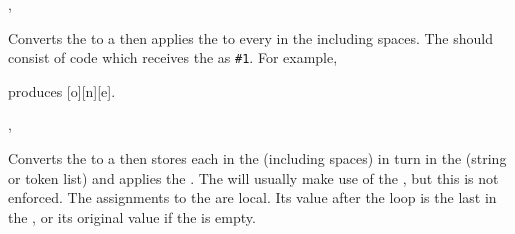 \documentclass[oneside]{book}
\begin{document}
\begin{function}{\StrMapInline,\StrVarMapInline}
\begin{syntax}
  
  
\end{syntax}
Converts the  to a  then
applies the  to every  in the
 including spaces.
The  should consist of code which
receives the  as \verb|#1|.
For example,
\begin{codehigh}
\IgnoreSpacesOn
\StrClear \lTmpaStr
{} {
  \StrPutRight \lTmpaStr {[#1]}
}
\Result{\StrUse\lTmpaStr}
\IgnoreSpacesOff
\end{codehigh}
produces [o][n][e].
\end{function}


\begin{function}{\StrMapVariable,\StrMapVariable}
\begin{syntax}
   
   
\end{syntax}
Converts the  to a  then stores each
 in the  (including spaces) in turn in
the (string or token list)  and applies the
.  The  will usually make use of the
, but this is not enforced.  The assignments to the
 are local.  Its value after the loop is the last
 in the , or its original value if the
 is empty.
\begin{demohigh}
\IgnoreSpacesOn
\StrClear \lTmpaStr
{} \lTmpiStr {
  \StrPutRight \lTmpaStr {\Expand {[\lTmpiStr]}}
}
\Result{\StrUse\lTmpaStr}
\IgnoreSpacesOff
\end{demohigh}
\end{function}
\end{document}
